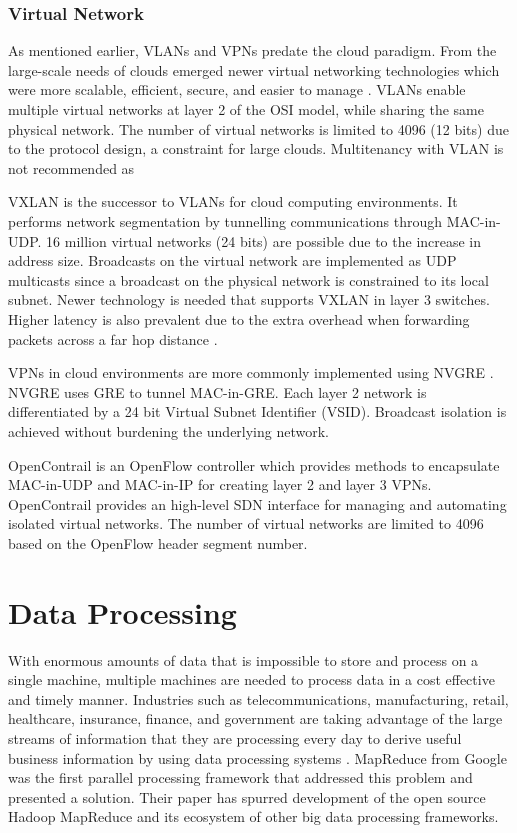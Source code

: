 \documentclass[12pt]{article}
\begin{document}
\subsubsection{Virtual Network}

As mentioned earlier, VLANs and VPNs predate the cloud paradigm. From the large-scale needs of clouds emerged newer virtual networking technologies which were more scalable, efficient, secure, and easier to manage \cite{wang2015survey}. VLANs enable multiple virtual networks at layer 2 of the OSI model, while sharing the same physical network. The number of virtual networks is limited to 4096 (12 bits) due to the protocol design, a constraint for large clouds. Multitenancy with VLAN is not recommended as

VXLAN \cite{vxlan} is the successor to VLANs for cloud computing environments. It performs network segmentation by tunnelling communications through MAC-in-UDP. 16 million virtual networks (24 bits) are possible due to the increase in address size. Broadcasts on the virtual network are implemented as UDP multicasts since a broadcast on the physical network is constrained to its local subnet. Newer technology is needed that supports VXLAN in layer 3 switches. Higher latency is also prevalent due to the extra overhead when forwarding packets across a far hop distance \cite{wang2015survey}.

VPNs in cloud environments are more commonly implemented using NVGRE \cite{nvgre}. NVGRE uses GRE to tunnel MAC-in-GRE. Each layer 2 network is differentiated by a 24 bit Virtual Subnet Identifier (VSID). Broadcast isolation is achieved without burdening the underlying network.

OpenContrail \cite{opencontrail} is an OpenFlow controller which provides methods to encapsulate MAC-in-UDP and MAC-in-IP for creating layer 2 and layer 3 VPNs. OpenContrail provides an high-level SDN interface for managing and automating isolated virtual networks. The number of virtual networks are limited to 4096 based on the OpenFlow header segment number.








\section{Data Processing} \label{sec:data-processing}

With enormous amounts of data that is impossible to store and process on a single machine, multiple machines are needed to process data in a cost effective and timely manner. Industries such as telecommunications, manufacturing, retail, healthcare, insurance, finance, and government are taking advantage of the large streams of information that they are processing every day to derive useful business information by using data processing systems \cite{ibmbigdataindustries}. MapReduce from Google \cite{dean2008mapreduce} was the first parallel processing framework that addressed this problem and presented a solution. Their paper has spurred development of the open source Hadoop MapReduce \cite{hadoop} and its ecosystem of other big data processing frameworks.
\end{document}
